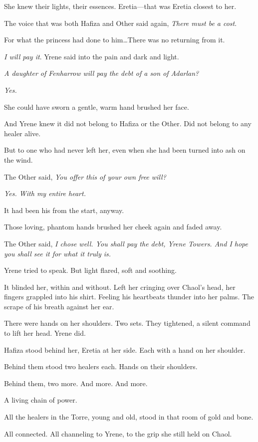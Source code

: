 She knew their lights, their essences.
Eretia---that was Eretia closest to her.

The voice that was both Hafiza and Other said again, \emph{There must be a cost}.

For what the princess had done to him\ldots There was no returning from it.

\emph{I will pay it}.
Yrene said into the pain and dark and light.

\emph{A daughter of Fenharrow will pay the debt of a son of Adarlan?}

\emph{Yes.}

She could have sworn a gentle, warm hand brushed her face.

And Yrene knew it did not belong to Hafiza or the Other.
Did not belong to any healer alive.

But to one who had never left her, even when she had been turned into ash on the wind.

The Other said, \emph{You offer this of your own free will?}

\emph{Yes.
With my entire heart.}

It had been his from the start, anyway.

Those loving, phantom hands brushed her cheek again and faded away.

The Other said, \emph{I chose well.
You shall pay the debt, Yrene Towers.
And I hope you shall see it for what it truly is.}

Yrene tried to speak.
But light flared, soft and soothing.

It blinded her, within and without.
Left her cringing over Chaol's head, her fingers grappled into his shirt.
Feeling his heartbeats thunder into her palms.
The scrape of his breath against her ear.

There were hands on her shoulders.
Two sets.
They tightened, a silent command to lift her head.
Yrene did.

Hafiza stood behind her, Eretia at her side.
Each with a hand on her shoulder.

Behind them stood two healers each.
Hands on their shoulders.

Behind them, two more.
And more.
And more.

A living chain of power.

All the healers in the Torre, young and old, stood in that room of gold and bone.

All connected.
All channeling to Yrene, to the grip she still held on Chaol.

